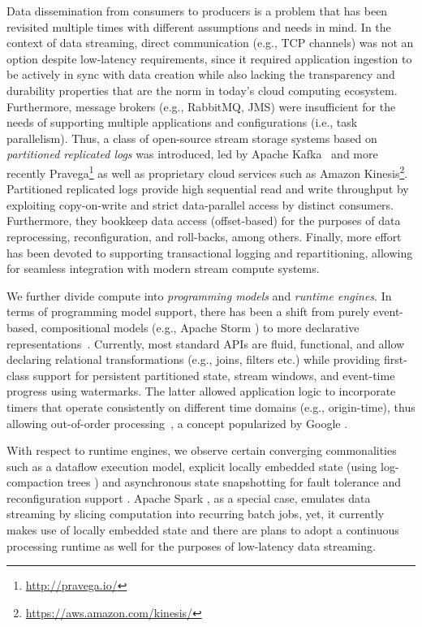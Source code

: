  Data dissemination from consumers to producers is a problem that has been revisited multiple times with different assumptions and needs in mind. In the context of data streaming, direct communication (e.g., TCP channels) was not an option despite low-latency requirements, since it required application ingestion to be actively in sync with data creation while also lacking the transparency and durability properties that are the norm in today's cloud computing ecosystem. Furthermore, message brokers (e.g., \textsf{\small RabbitMQ}, \textsf{\small JMS}) were insufficient for the needs of supporting multiple applications and configurations (i.e., task parallelism). Thus, a class of open-source stream storage systems based on \emph{partitioned replicated logs} was introduced, led by \textsf{\small Apache Kafka}~\cite{kreps2011kafka} and more recently \textsf{\small Pravega}\footnote{\url{http://pravega.io/}} as well as proprietary cloud services such as \textsf{\small Amazon Kinesis}\footnote{\url{https://aws.amazon.com/kinesis/}}. Partitioned replicated logs provide high sequential read and write throughput by exploiting copy-on-write and strict data-parallel access by distinct consumers. Furthermore, they bookkeep data access (offset-based) for the purposes of data reprocessing, reconfiguration, and roll-backs, among others. Finally, more effort has been devoted to supporting transactional logging and repartitioning, allowing for seamless integration with modern stream compute systems.

 We further divide compute into \emph{programming models} and \emph{runtime engines}. In terms of programming model support, there has been a shift from purely event-based, compositional models (e.g., \textsf{\small Apache Storm} \cite{toshniwal_et_al_2014}) to more declarative representations~\cite{carbone_et_al_2015,akidau2015dataflow,zaharia_et_al_2013}. Currently, most standard APIs are fluid, functional, and allow declaring relational transformations (e.g., joins, filters etc.) while providing first-class support for persistent partitioned state, stream windows, and event-time prog\-ress using watermarks. The latter allowed application logic to incorporate timers that operate consistently on different time domains (e.g., origin-time), thus allowing out-of-order processing~\cite{li2008out},  a concept popularized by Google \cite{millwheel,akidau2015dataflow}.

With respect to runtime engines, we observe certain converging commonalities such as a dataflow execution model, explicit locally embedded state (using log-compaction trees \cite{CUSTOM:web/rocksdb}) and asynchronous state snapshotting for fault tolerance and reconfiguration support \cite{state2017carbone,jacques2016consistent}. Apache Spark \cite{zaharia_et_al_2013}, as a special case, emulates data streaming by slicing computation into recurring batch jobs, yet, it currently makes use of locally embedded state and there are plans to adopt a continuous processing runtime as well for the purposes of low-latency data streaming.

